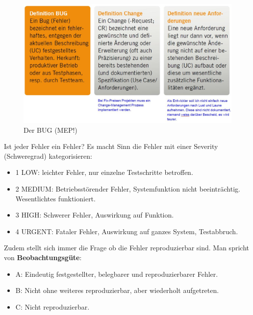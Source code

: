 \begin{figure}[h!]
\centering
\includegraphics[width=0.7\linewidth]{fig/der-bug}
\caption{Der BUG (MEP!)}
\label{fig:der-bug}
\end{figure}

Ist jeder Fehler ein Fehler? Es macht Sinn die Fehler mit einer Severity (Schweregrad) kategorisieren:
\begin{itemize}
	\item 1 LOW: leichter Fehler, nur einzelne Testschritte betroffen.
	\item 2 MEDIUM: Betriebsstörender Fehler, Systemfunktion nicht beeinträchtig. Wesentlichtes funktioniert.
	\item 3 HIGH: Schwerer Fehler, Auswirkung auf Funktion.
	\item 4 URGENT: Fataler Fehler, Auswirkung auf ganzes System, Testabbruch.
\end{itemize}

Zudem stellt sich immer die Frage ob die Fehler reproduzierbar sind. Man spricht von \textbf{Beobachtungsgüte}:
\begin{itemize}
	\item A: Eindeutig festgestellter, belegbarer und reproduzierbarer Fehler.
	\item B: Nicht ohne weiteres reproduzierbar, aber wiederholt aufgetreten.
	\item C: Nicht reproduzierbar.	
\end{itemize}
